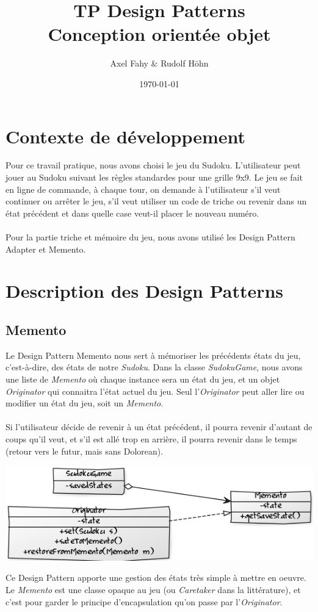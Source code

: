 \documentclass[a4paper]{article}
\title{TP Design Patterns\\Conception orientée objet}
\author{Axel Fahy \& Rudolf Höhn}
\date{\today}
\begin{document}
\maketitle

\section{Contexte de développement}
Pour ce travail pratique, nous avons choisi le jeu du Sudoku.
L'utilisateur peut jouer au Sudoku suivant les règles standardes pour une grille 9x9.
Le jeu se fait en ligne de commande, à chaque tour, on demande à l'utilisateur s'il veut continuer ou arrêter le jeu,
s'il veut utiliser un code de triche ou revenir dans un état précédent et dans quelle case veut-il placer le nouveau numéro.
\\\\
Pour la partie triche et mémoire du jeu, nous avons utilisé les Design Pattern Adapter et Memento.

\section{Description des Design Patterns}

\subsection{Memento}
Le Design Pattern Memento nous sert à mémoriser les précédents états du jeu, c'est-à-dire, des états de notre \textit{Sudoku}.
Dans la classe \textit{SudokuGame}, nous avons une liste de \textit{Memento} où chaque instance sera un état du jeu, et un objet \textit{Originator} qui connaitra l'état actuel du jeu.
Seul l'\textit{Originator} peut aller lire ou modifier un état du jeu, soit un \textit{Memento}.\\\\
Si l'utilisateur décide de revenir à un état précédent, il pourra revenir d'autant de coups qu'il veut, et s'il est allé trop en arrière, il pourra revenir dans le temps (retour vers le futur, mais sans Dolorean).
\begin{center}
\includegraphics[scale=0.7]{../diagrams/memento.png}
\end{center}
Ce Design Pattern apporte une gestion des états très simple à mettre en oeuvre.
Le \textit{Memento} est une classe opaque au jeu (ou \textit{Caretaker} dans la littérature), et c'est pour garder le principe d'encapsulation qu'on passe par l'\textit{Originator}.
\newpage
\end{document}
